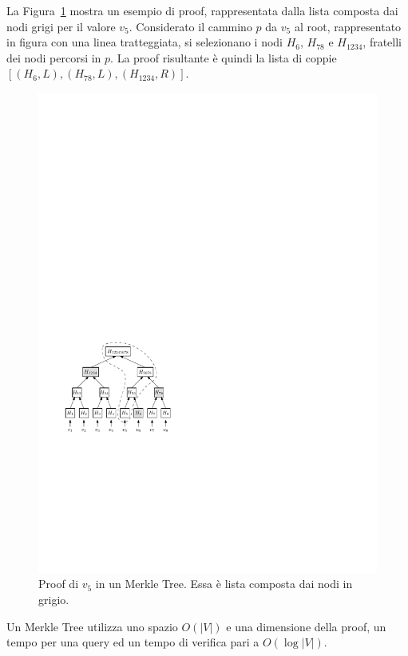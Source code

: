 La Figura~\ref{fig:mht_proof} mostra un esempio di proof, rappresentata dalla lista composta dai nodi grigi per il valore $v_5$. Considerato il cammino $p$ da $v_5$ al root, rappresentato in figura con una linea tratteggiata, si selezionano i nodi $H_6$, $H_{78}$ e $H_{1234}$, fratelli dei nodi percorsi in $p$. La proof risultante è quindi la lista di coppie $[(H_6, L), (H_{78}, L), (H_{1234}, R)]$.

\begin{figure}
	\centering
	\includegraphics[scale=1.4]{img/capuno/proof.pdf}
	\caption{Proof di $v_5$ in un Merkle Tree. Essa è lista composta dai nodi in grigio.}
	\label{fig:mht_proof}
\end{figure}

Un Merkle Tree utilizza uno spazio $O(|V|)$ e una dimensione della proof, un tempo per una query ed un tempo di verifica pari a $O(\log{|V|})$.


